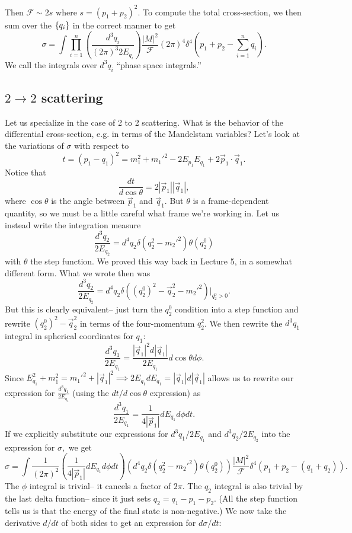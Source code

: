 Then $\mathcal{F}\sim 2s$ where $s=(p_1+p_2)^2$. To compute the total cross-section, we then sum over the $\{q_i\}$ in the correct manner to get
$$\sigma = \int \prod_{i=1}^n \left(\frac{d^3 q_i}{(2\pi)^3 2E_{q_i}}\right)\frac{|M|^2}{\mathcal{F}} (2\pi)^4 \delta^4(p_1+p_2 -\sum_{i=1}^n q_i).$$
We call the integrals over $d^3q_i$ ``phase space integrals.''

\subsection*{$2\to 2$ scattering}
Let us specialize in the case of 2 to 2 scattering. What is the behavior of the differential cross-section, e.g. in terms of the Mandelstam variables? Let's look at the variations of $\sigma$ with respect to 
$$t=(p_1-q_1)^2=m_1^2+{m_1'}^2-2E_{p_1}E_{q_1}+2 \vec p_1 \cdot \vec q_1.$$ Notice that
$$\frac{dt}{d\cos\theta}=2|\vec p_1||\vec q_1|,$$
where $\cos\theta$ is the angle between $\vec p_1$ and $\vec q_1$. But $\theta$ is a frame-dependent quantity, so we must be a little careful what frame we're working in. Let us instead write the integration measure
$$\frac{d^3q_2}{2E_{q_2}}=d^4 q_2\delta(q_2^2-{m_2'}^2) \theta(q_2^0)$$
with $\theta$ the step function. We proved this way back in Lecture 5, in a somewhat different form. What we wrote then was 
$$\frac{d^3q_2}{2E_{q_2}}=d^4 q_2 \delta((q_2^0)^2-\vec q_2^2 -{m_2'}^2)|_{q_2^0>0}.$$
But this is clearly equivalent-- just turn the $q_2^0$ condition into a step function and rewrite $(q_2^0)^2-\vec q_2^2$ in terms of the four-momentum $q_2^2$.
We then rewrite the $d^3q_1$ integral in spherical coordinates for $q_1$:
$$\frac{d^3q_1}{2E_{q_1}}=\frac{|\vec q_1|^2 d|\vec q_1|}{2E_{q_1}} d\cos\theta d\phi.$$
Since $E_{q_1}^2+m_1^2={m_1'}^2 +|\vec q_1|^2 \implies 2E_{q_1}dE_{q_1}=|\vec q_1|d|\vec q_1|$ allows us to rewrite our expression for $\frac{d^3q_1}{2E_{q_1}}$ (using the $dt/d\cos\theta$ expression) as
$$\frac{d^3q_1}{2E_{q_1}}=\frac{1}{4|\vec p_1|} dE_{q_1}d\phi dt.$$
If we explicitly substitute our expressions for $d^3q_1/2E_{q_1}$ and $d^3q_2/2E_{q_2}$ into the expression for $\sigma,$
we get
$$\sigma=\int \frac{1}{(2\pi)^2} \left(\frac{1}{4|\vec p_1|} dE_{q_1} d\phi dt\right)\left(d^4 q_2 \delta(q_2^2 -{m_2'}^2)\theta(q_2^0)\right)\frac{|M|^2}{\mathcal{F}}\delta^4 (p_1+p_2-(q_1+q_2)).$$
The $\phi$ integral is trivial-- it cancels a factor of $2\pi$. The $q_2$ integral is also trivial by the last delta function-- since it just sets $q_2=q_1-p_1-p_2$. (All the step function tells us is that the energy of the final state is non-negative.) We now take the derivative $d/dt$ of both sides to get an expression for $d\sigma/dt$:
